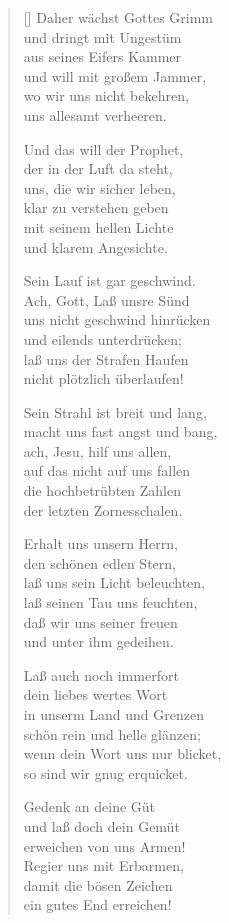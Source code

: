 \begin{multicols}{2}
\begin{verse}[\versewidth]
 Daher wächst Gottes Grimm\\
und dringt mit Ungestüm\\
aus seines Eifers Kammer\\
und will mit großem Jammer,\\
wo wir uns nicht bekehren,\\
uns allesamt verheeren.

 Und das will der Prophet,\\
der in der Luft da steht,\\
uns, die wir sicher leben,\\
klar zu verstehen geben\\
mit seinem hellen Lichte\\
und klarem Angesichte.

 Sein Lauf ist gar geschwind.\\
Ach, Gott, Laß unsre Sünd\\
uns nicht geschwind hinrücken\\
und eilends unterdrücken;\\
laß uns der Strafen Haufen\\
nicht plötzlich überlaufen!

 Sein Strahl ist breit und lang,\\
macht uns fast angst und bang,\\
ach, Jesu, hilf uns allen,\\
auf das nicht auf uns fallen\\
die hochbetrübten Zahlen\\
der letzten Zornesschalen.

 Erhalt uns unsern Herrn,\\
den schönen edlen Stern,\\
laß uns sein Licht beleuchten,\\
laß seinen Tau uns feuchten,\\
daß wir uns seiner freuen\\
und unter ihm gedeihen.

 Laß auch noch immerfort\\
dein liebes wertes Wort\\
in unserm Land und Grenzen\\
schön rein und helle glänzen;\\
wenn dein Wort uns nur blicket,\\
so sind wir gnug erquicket.

 Gedenk an deine Güt\\
und laß doch dein Gemüt\\
erweichen von uns Armen!\\
Regier uns mit Erbarmen,\\
damit die bösen Zeichen\\
ein gutes End erreichen!
 
\end{verse}
\end{multicols}
